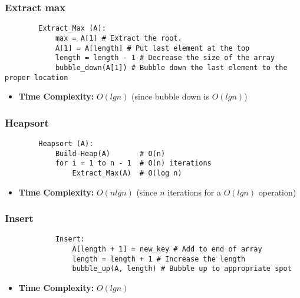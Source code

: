     \subsubsection{Extract max}
    \begin{definition}
        \begin{lstlisting}
        Extract_Max (A): 
            max = A[1] # Extract the root.
            A[1] = A[length] # Put last element at the top
            length = length - 1 # Decrease the size of the array
            bubble_down(A[1]) # Bubble down the last element to the proper location
        \end{lstlisting}
        \begin{itemize}
            \item \textbf{Time Complexity:} $O(lg n)$ (since bubble down is $O(lg n)$)
        \end{itemize}
    \end{definition}

    \subsubsection{Heapsort}
    \begin{definition}
        \begin{lstlisting}
        Heapsort (A):
            Build-Heap(A)       # O(n)
            for i = 1 to n - 1  # O(n) iterations
                Extract_Max(A)  # O(log n)
        \end{lstlisting}
        \begin{itemize}
            \item \textbf{Time Complexity:} $O(nlg n)$ (since $n$ iterations for a $O(lg n)$ operation)
        \end{itemize}

    \end{definition}

    \subsubsection{Insert}
    \begin{definition}
        \begin{lstlisting}
            Insert:
                A[length + 1] = new_key # Add to end of array 
                length = length + 1 # Increase the length
                bubble_up(A, length) # Bubble up to appropriate spot
        \end{lstlisting}
        \begin{itemize}
            \item \textbf{Time Complexity:} $O(lg n)$
        \end{itemize}
    \end{definition}

